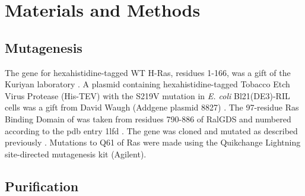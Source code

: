 \section{Materials and Methods} \label{ras-methods}

\subsection{Mutagenesis}

The gene for hexahistidine-tagged WT H-Ras, residues 1-166, was a gift of the Kuriyan laboratory \cite{Boriack-Sjodin1998}. 
A plasmid containing hexahistidine-tagged Tobacco Etch Virus Protease (His-TEV) with the S219V mutation in \emph{E. coli} Bl21(DE3)-RIL cells was a gift from David Waugh (Addgene plasmid 8827) \cite{Kapust2001}. 
The 97-residue Ras Binding Domain of \RalB{} was taken from residues 790-886 of RalGDS and numbered according to the pdb entry 1lfd \cite{Huang1998}. 
The gene was cloned and mutated as described previously \cite{Stafford2012, Stafford2010}.
Mutations to Q61 of Ras were made using the Quikchange Lightning site-directed mutagenesis kit (Agilent).

\subsection{Purification}

